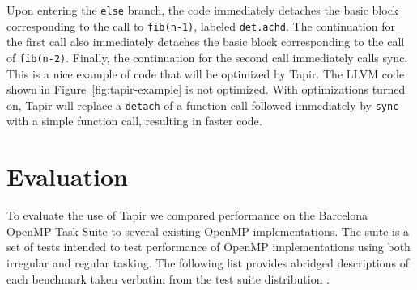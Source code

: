 \documentclass[sigconf]{acmart}
\newcommand{\figref}[1]         {Figure~\ref{fig:#1}}
\begin{document}
Upon entering the \texttt{else} branch, the code immediately detaches the basic
block corresponding to the call to \texttt{fib(n-1)}, labeled
\texttt{det.achd}. The continuation for the first call also immediately
detaches the basic block corresponding to the call of \texttt{fib(n-2)}.
Finally, the continuation for the second call immediately calls sync. This is
a nice example of code that will be optimized by Tapir. The LLVM code
shown in \figref{tapir-example} is not optimized. With optimizations turned
on, Tapir will replace a \texttt{detach} of a function call followed
immediately by \texttt{sync} with a simple function call, resulting in faster
code. 

\section{Evaluation} \label{Sec:Evaluation}

To evaluate the use of Tapir we compared performance on the Barcelona OpenMP Task 
Suite to several existing OpenMP implementations. The suite is a set of tests
intended to test performance of OpenMP implementations using both irregular and
regular tasking. The following list provides abridged descriptions of each
benchmark taken verbatim from the test suite distribution \cite{bots}.
\end{document}
